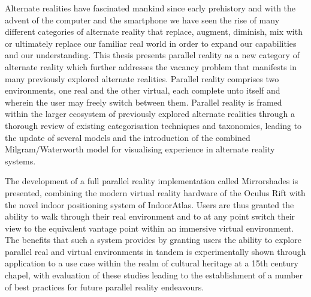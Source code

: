 Alternate realities have fascinated mankind since early prehistory and with the advent of the computer and the smartphone we have seen the rise of many different categories of alternate reality that replace, augment, diminish, mix with or ultimately replace our familiar real world in order to expand our capabilities and our understanding. This thesis presents parallel reality as a new category of alternate reality which further addresses the vacancy problem that manifests in many previously explored alternate realities. Parallel reality comprises two environments, one real and the other virtual, each complete unto itself and wherein the user may freely switch between them. Parallel reality is framed within the larger ecosystem of previously explored alternate realities through a thorough review of existing categorisation techniques and taxonomies, leading to the update of several models and the introduction of the combined Milgram/Waterworth model for visualising experience in alternate reality systems.

The development of a full parallel reality implementation called Mirrorshades is presented, combining the modern virtual reality hardware of the Oculus Rift with the novel indoor positioning system of IndoorAtlas. Users are thus granted the ability to walk through their real environment and to at any point switch their view to the equivalent vantage point within an immersive virtual environment. The benefits that such a system provides by granting users the ability to explore parallel real and virtual environments in tandem is experimentally shown through application to a use case within the realm of cultural heritage at a 15th century chapel, with evaluation of these studies leading to the establishment of a number of best practices for future parallel reality endeavours.